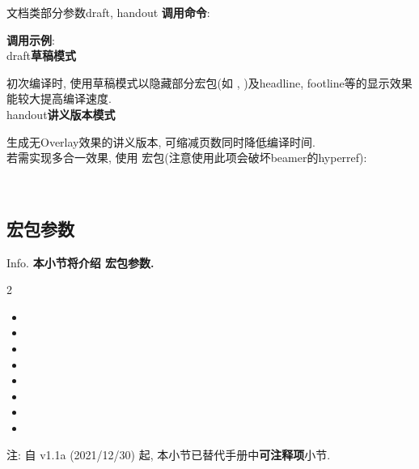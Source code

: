 \begin{frame}{文档类部分参数}{draft, handout}
	\textbf{调用命令}: 

  \textbf{调用示例}: \\

  \alert{\ttfamily draft}\hfill \textbf{草稿模式}

	初次编译时, 使用草稿模式以隐藏部分宏包(如 , )及headline, footline等的显示效果能较大提高编译速度.\\

	\alert{\ttfamily handout}\hfill \textbf{讲义版本模式}

	生成无Overlay效果的讲义版本, 可缩减页数同时降低编译时间.\\
	若需实现多合一效果, 使用  宏包(注意使用此项会破坏beamer的hyperref):
	\begin{center}
		\begin{minipage}{.8\textwidth}
			\raggedright
			\\
		\end{minipage}
	\end{center}
\end{frame}

\subsection{ 宏包参数}
\begin{frame}{Info.}
	\textbf{本小节将介绍  宏包参数.}
	\begin{multicols}{2}
		\begin{itemize}
			\item {}
			\item {}
			\item {}
			\item {}
			\item {}
			\item {}
			\item {}
			\item {}
		\end{itemize}
	\end{multicols}
	注: 自 \textcolor{scugreen}{v1.1a (2021/12/30)} 起, 本小节已替代手册中\alert{\bfseries 可注释项}小节.\par
	\mycopyright
\end{frame}


